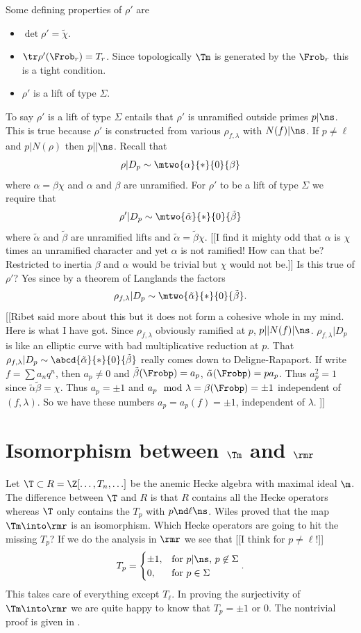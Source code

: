 \documentclass{report}
\begin{document}
Some defining properties of $\rho'$ are
\begin{itemize}
\item $\det \rho'=\tilde{\chi}$.
\item $\tr \rho'(\Frob_r)=T_r$. Since topologically $\Tm$ is generated
by the $\Frob_r$ this is a tight condition.
\item $\rho'$ is a lift of type $\Sigma$.
\end{itemize}

To say $\rho'$ is a lift of type $\Sigma$ entails that $\rho'$ is unramified
outside primes $p|\ns$. This is true because $\rho'$
is constructed from various $\rho_{f,\lambda}$ with $N(f)|\ns$.
If $p\neq\ell$ and $p|N(\rho)$ then $p||\ns$. Recall that
$$\rho|D_p\sim\mtwo{\alpha}{*}{0}{\beta}$$
where $\alpha=\beta\chi$ and $\alpha$ and $\beta$ are unramified.
For $\rho'$ to be a lift of type $\Sigma$ we require that
$$\rho'|D_p\sim\mtwo{\tilde{\alpha}}{*}{0}{\tilde{\beta}}$$
where $\tilde{\alpha}$ and $\tilde{\beta}$ are unramified lifts and
$\tilde{\alpha}=\tilde{\beta}\chi$.
[[I find it mighty odd that $\alpha$ is $\chi$ times an unramified character
and yet $\alpha$ is not ramified! How can that be? Restricted to
inertia $\beta$ and $\alpha$ would be trivial but $\chi$ would not be.]]
Is this true of $\rho'$?
Yes since by a theorem of Langlands the factors
$$\rho_{f,\lambda}|D_p\sim\mtwo{\tilde{\alpha}}{*}{0}{\tilde{\beta}}.$$
[[Ribet said more about this but it does not form a cohesive whole
in my mind. Here is what I have got. Since $\rho_{f,\lambda}$ obviously
ramified at $p$, $p||N(f)|\ns$. $\rho_{f,\lambda}|D_p$ is like an
elliptic curve with bad multiplicative reduction at $p$.
That $\rho_{f,\lambda}|D_p\sim\abcd{\tilde{\alpha}}{*}{0}{\tilde{\beta}}$
really comes down to Deligne-Rapaport. If write $f=\sum a_n q^n$,
then $a_p\neq 0$ and $\tilde{\beta}(\Frobp)=a_p$,
$\tilde{\alpha}(\Frobp)=pa_p$. Thus $a_p^2=1$ since
$\tilde{\alpha}\tilde{\beta}=\chi$. Thus $a_p=\pm 1$ and
$a_p \mod\lambda = \beta(\Frobp)=\pm 1$ independent of $(f,\lambda)$.
So we have these numbers $a_p=a_p(f)=\pm 1$, independent of $\lambda$. ]]

\section{Isomorphism between $\Tm$ and $\rmr$}
Let $\T\subset R=\Z[\ldots,T_n,\ldots]$ be the anemic Hecke algebra
with maximal ideal $\m$. The difference between $\T$ and $R$ is that
$R$ contains all the Hecke operators whereas $\T$ only contains the
$T_p$ with $p\nd\ell\ns$. Wiles proved that the map
$\Tm\into \rmr$ is an isomorphism. Which Hecke operators are going
to hit the missing $T_p$? If we do the analysis in $\rmr$ we see that
[[I think for $p\neq \ell$!]]
$$T_p=\begin{cases}
      \pm 1, & \text{for $p|\ns$, $p\not\in\Sigma$}\\
      0, & \text{for $p\in\Sigma$}\end{cases}.$$
This takes care of everything except $T_{\ell}$.
In proving the surjectivity of $\Tm\into\rmr$ we are quite happy to know
that $T_p=\pm 1$ or $0$. The nontrivial proof
is given in \cite{ddt}.
\end{document}
